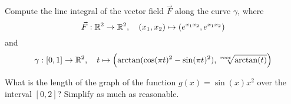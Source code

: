 \documentclass[11pt]{article}
\begin{document}
\begin{exercise}
    Compute the line integral of the vector field $\vec{F}$ along the curve $\gamma$, where 
    \[
        \vec F : \mathbb{R}^2 \to \mathbb{R}^2, \quad (x_1,x_2) \mapsto ( e^{ x_1x_2 }, e^{ x_1 x_2 } )
    \]
    and 
    \[
        \gamma : [0,1] \to \mathbb{R}^2, \quad t \mapsto \left( \arctan( \cos(\pi t)^2 - \sin(\pi t)^2 ), \sqrt[root]{\arctan(t)} \right)
    \]
\end{exercise}
\begin{solution}
\end{solution}

\begin{exercise}
    What is the length of the graph of the function $g(x) = \sin(x) x^2$ over the interval $[0,2]$?
    Simplify as much as reasonable.
\end{exercise}
\begin{solution}
\end{solution}

\begin{exercise}
\end{exercise}
\begin{solution}     
\end{solution}
\end{document}
